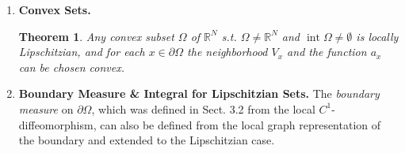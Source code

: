 \documentclass{book}
\numberwithin{equation}{section}
\newtheorem{theorem}{Theorem}[section]
\begin{document}
\begin{enumerate}
\begin{enumerate}
        Similarly the set
        \begin{align*}
            \Omega := \bigcup_{n = 1}^\infty \Omega_n,\ \Omega_n := \left\{y\in\mathbb{R}^N;\left|y - \frac{1}{2^n}\right| < \frac{1}{2^{n+2}}\right\}
        \end{align*}
        is not locally Lipschitzian since the conditions of Definition 5.2 (i) are not satisfied in $0\in\partial\Omega$.
        
        However, the set
        \begin{align*}
            \Omega := \bigcup_{n = 1}^\infty \Omega_n,\ \Omega_n := \left\{y\in\mathbb{R}^N;\left|y - n\right| < \frac{1}{2^{n+2}}\right\}
        \end{align*}
        is locally Lipschitzian, but not Lipschitzian or equi-Lipschitzian in the sense of Definition 5.2.
        
        1 of the important properties of a bounded (open) Lipschitzian domain $\Omega$ is the existence of a \textit{continuous linear extension} of functions of the Sobolev space $H^k(\Omega)$ from $\Omega$ to functions in $H^k(\mathbb{R}^N)$ defined on $\mathbb{R}^N$, i.e. \textbf{(5.28)}
        \begin{align*}
            E:H^k(\Omega)\to H^k\left(\mathbb{R}^N\right) \mbox{ and } \forall\varphi\in H^k(\Omega),\ \left.\left(E\varphi\right)\right|_\Omega = \varphi,
        \end{align*}
        (cf. the Calderón extension theorem in R. A. Adams [1, p. 83, Thm. 4.32, p. 91] and J. Nečas [1, Thm. 3.10, p. 80]).
        
        This property is also important in the existence of optimal domains when it is uniform for a given family.
        
        E.g., this will occur for the family of domains satisfying the uniform cone property of section 6.4.1.
        \item \textbf{Convex Sets.}
        \begin{theorem}
            Any convex subset $\Omega$ of $\mathbb{R}^N$ s.t. $\Omega\ne\mathbb{R}^N$ and $\operatorname{int}\Omega\ne\emptyset$ is locally Lipschitzian, and for each $x\in\partial\Omega$ the neighborhood $V_x$ and the function $a_x$ can be chosen convex.
        \end{theorem}
        \item \textbf{Boundary Measure \& Integral for Lipschitzian Sets.} The \textit{boundary measure} on $\partial\Omega$, which was defined in Sect. 3.2 from the local $C^1$-diffeomorphism, can also be defined from the local graph representation of the boundary and extended to the Lipschitzian case.
        

\end{enumerate}
\end{enumerate}
\end{document}
